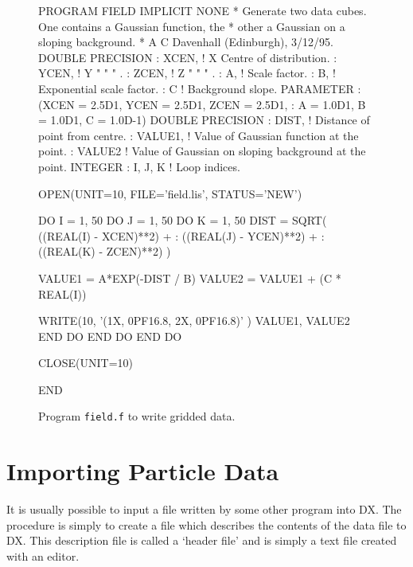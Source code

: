 \documentclass[twoside,11pt]{starlink}
\begin{document}
\begin{figure}[htbp]

\begin{terminalv}
      PROGRAM FIELD
      IMPLICIT NONE
*    Generate two data cubes.  One contains a Gaussian function, the
*    other a Gaussian on a sloping background.
*    A C Davenhall (Edinburgh), 3/12/95.
      DOUBLE PRECISION
     :  XCEN,   ! X Centre of distribution.
     :  YCEN,   ! Y   "    "       "      .
     :  ZCEN,   ! Z   "    "       "      .
     :  A,      ! Scale factor.
     :  B,      ! Exponential scale factor.
     :  C       ! Background slope.
      PARAMETER
     : (XCEN = 2.5D1,  YCEN = 2.5D1,  ZCEN = 2.5D1,
     :  A = 1.0D1,     B = 1.0D1,     C = 1.0D-1)
      DOUBLE PRECISION
     :  DIST,   ! Distance of point from centre.
     :  VALUE1, ! Value of Gaussian function at the point.
     :  VALUE2  ! Value of Gaussian on sloping background at the point.
      INTEGER
     :  I, J, K ! Loop indices.

      OPEN(UNIT=10, FILE='field.lis', STATUS='NEW')

      DO I = 1, 50
         DO J = 1, 50
            DO K = 1, 50
               DIST = SQRT( ((REAL(I) - XCEN)**2) +
     :           ((REAL(J) - YCEN)**2) +
     :           ((REAL(K) - ZCEN)**2) )

               VALUE1 = A*EXP(-DIST / B)
               VALUE2 = VALUE1 + (C * REAL(I))

               WRITE(10, '(1X, 0PF16.8, 2X, 0PF16.8)' ) VALUE1, VALUE2
            END DO
         END DO
      END DO

      CLOSE(UNIT=10)

      END
\end{terminalv}

\caption[Program \texttt{field.f} to write gridded data.]{Program \texttt{field.f} to write gridded data. \label{FIELD.F} }

\end{figure}


\newpage
\section{\label{IMP_PART}Importing Particle Data}


It is usually possible to input a file written by some other program
into DX. The procedure is simply to create a file which describes the
contents of the data file to DX. This description file is called a
`header file' and is simply a text file created with an editor.
\end{document}
